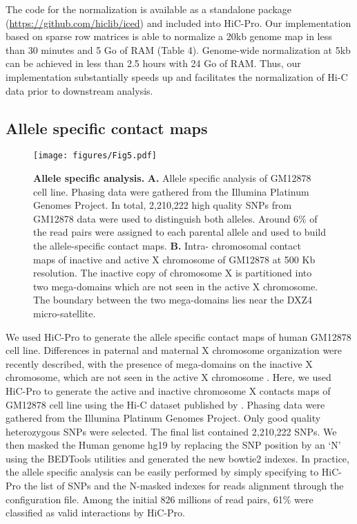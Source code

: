 The code for the normalization is available as a standalone package
(\href{https://github.com/hiclib/iced}{https://github.com/hiclib/iced}) and
included into HiC-Pro. Our implementation based on sparse row matrices is able
to normalize a 20kb genome map in less than 30 minutes and 5 Go of RAM (Table
4). Genome-wide normalization at 5kb can be achieved in less than 2.5 hours
with 24 Go of RAM. Thus, our implementation substantially speeds up and
facilitates the normalization of Hi-C data prior to downstream analysis.

\subsection{Allele specific contact maps}

\begin{figure}
\texttt{[image: figures/Fig5.pdf]}
\caption{\textbf{Allele specific analysis.} \textbf{A.} Allele specific analysis of
GM12878 cell line. Phasing data were gathered from the Illumina Platinum
Genomes Project. In total, 2,210,222 high quality SNPs from GM12878 data were
used to distinguish both alleles. Around 6\% of the read pairs were assigned to
each parental allele and used to build the allele-specific contact maps.
\textbf{B.}
Intra- chromosomal contact maps of inactive and active X chromosome of GM12878
at 500 Kb resolution. The inactive copy of chromosome X is partitioned into
two mega-domains which are not seen in the active X chromosome. The boundary
between the two mega-domains lies near the DXZ4 micro-satellite.}
\label{fig:fig5}
\end{figure}



We used HiC-Pro to generate the allele specific contact maps of human GM12878
cell line. Differences in paternal and maternal X chromosome organization were
recently described, with the presence of mega-domains on the inactive X
chromosome, which are not seen in the active X chromosome \citep{rao:3d,
minajigi:comprehensive}. Here, we used HiC-Pro to generate the active and
inactive chromosome X contacts maps of GM12878 cell line using the Hi-C
dataset published by \citep{selvaraj:whole-genome}. Phasing data were gathered
from the Illumina Platinum Genomes Project. Only good quality heterozygous
SNPs were selected. The final list contained 2,210,222 SNPs. We then masked
the Human genome hg19 by replacing the SNP position by an ‘N’ using the
BEDTools utilities \citep{quinlan:bedtools} and generated the new bowtie2
indexes. In practice, the allele specific analysis can be easily performed by
simply specifying to HiC-Pro the list of SNPs and the N-masked indexes for
reads alignment through the configuration file. Among the initial 826 millions
of read pairs, 61\% were classified as valid interactions by HiC-Pro.

